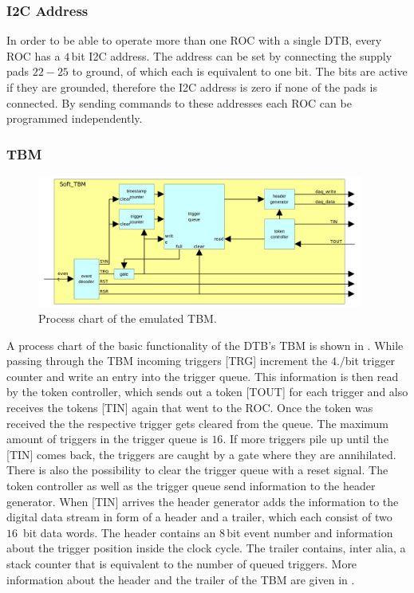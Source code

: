 \documentclass[british,11pt,a4paper]{memoir}
\begin{document}
\subsubsection{\ac{I2C} Address}\label{si2c}
In order to be able to operate more than one \ac{ROC} with a single \ac{DTB}, every \ac{ROC} has a $4\,$bit \ac{I2C} address. The address can be set by connecting the supply pads $22-25$ to ground, of which each is equivalent to one bit. The bits are active if they are grounded, therefore the \ac{I2C} address is zero if none of the pads is connected. By sending commands to these addresses each \ac{ROC} can be programmed independently.
\subsubsection{\ac{TBM}}\label{stbm}
\begin{figure}[ht]
	\centering
	\includegraphics[width=0.95\textwidth]{tbm}
	\caption{Process chart of the emulated \ac{TBM}.}
	\label{ptbm}
\end{figure}\no
A process chart of the basic functionality of the \ac{DTB}'s \ac{TBM} is shown in . While passing through the \ac{TBM} incoming triggers [TRG]  increment the $4./$bit trigger counter and write an entry into the trigger queue. This information is then read by the token controller, which sends out a token [TOUT] for each trigger and also receives the tokens [TIN] again that went to the \ac{ROC}. Once the token was received the the respective trigger gets cleared from the queue. The maximum amount of triggers in the trigger queue is $16$. If more triggers pile up until the [TIN] comes back, the triggers are caught by a gate where they are annihilated. There is also the possibility to clear the trigger queue with a reset signal. The token controller as well as the trigger queue send information to the header generator. When [TIN] arrives the header generator adds the information to the digital data stream in form of a header and a trailer, which each consist of two $16\,$ bit data words. The header contains an $8\,$bit event number and information about the trigger position inside the clock cycle.  The trailer contains, inter alia, a stack counter that is equivalent to the number of queued triggers. More information about the header and the trailer of the \ac{TBM} are given in . 
\end{document}
